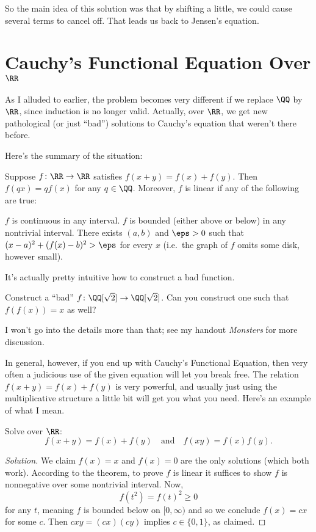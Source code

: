 \documentclass[11pt]{scrartcl}
\begin{document}
So the main idea of this solution was that by shifting a little,
we could cause several terms to cancel off.
That leads us back to Jensen's equation.

\section{Cauchy's Functional Equation Over $\RR$}
As I alluded to earlier, the problem becomes very
different if we replace $\QQ$ by $\RR$, since
induction is no longer valid.
Actually, over $\RR$, we get new pathological (or just ``bad'')
solutions to Cauchy's equation that weren't there before.

Here's the summary of the situation:
\begin{theorem}
  Suppose $f \colon \RR \to \RR$ satisfies $f(x+y) = f(x) + f(y)$.
  Then $f(qx) = qf(x)$ for any $q \in \QQ$.
  Moreover, $f$ is linear if any of the following are true:
  \begin{itemize}
    \ii $f$ is continuous in any interval.
    \ii $f$ is bounded (either above or below) in any nontrivial interval.
    \ii There exists $(a,b)$ and $\eps > 0$ such that $(x-a)^2 + (f(x)-b)^2 > \eps$ for every $x$
    (i.e.\ the graph of $f$ omits some disk, however small).
  \end{itemize}
\end{theorem}
It's actually pretty intuitive how to construct a bad function.
\begin{exercise}
  Construct a ``bad'' $f \colon \QQ[\sqrt2] \to \QQ[\sqrt2]$.
  Can you construct one such that $f(f(x)) = x$ as well?
\end{exercise}
I won't go into the details more than that; see my handout \emph{Monsters} for more discussion.

In general, however, if you end up with Cauchy's Functional Equation,
then very often a judicious use of the given equation will let you break free.
The relation $f(x+y) = f(x) + f(y)$ is very powerful,
and usually just using the multiplicative structure a little bit will get you what you need.
Here's an example of what I mean.

\begin{example}
  Solve over $\RR$:
  \[ f(x+y) = f(x) + f(y) \quad\text{and}\quad f(xy) = f(x)f(y). \]
\end{example}
\begin{proof}
  [Solution]
  We claim $f(x) = x$ and $f(x) = 0$ are the only solutions (which both work).
  According to the theorem, to prove $f$ is linear it suffices to show $f$ is nonnegative
  over some nontrivial interval.
  Now, \[ f(t^2) = f(t)^2 \ge 0 \] for any $t$,
  meaning $f$ is bounded below on $[0,\infty)$
  and so we conclude $f(x) = cx$ for some $c$.
  Then $cxy = (cx)(cy)$ implies $c \in \{0,1\}$, as claimed.
\end{proof}
\end{document}
